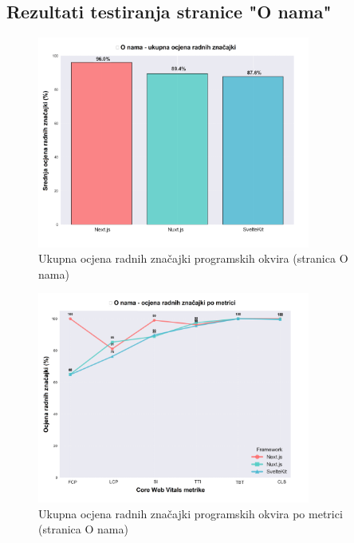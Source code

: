 \subsection{Rezultati testiranja stranice "O nama"}

\begin{figure}[H]
    \centering
    \includegraphics[width=0.8\textwidth]{slike/rezultati/about/about_framework_overall_performance.png}
    \caption{Ukupna ocjena radnih značajki programskih okvira (stranica O nama)}
    \label{fig:testiranje-o-nama-ukupne-performanse}
\end{figure}

\begin{figure}[H]
    \centering
    \includegraphics[width=0.8\textwidth]{slike/rezultati/about/about_performance_by_metric.png}
    \caption{Ukupna ocjena radnih značajki programskih okvira po metrici (stranica O nama)}
    \label{fig:testiranje-o-nama-performanse-po-metrici}
\end{figure}

